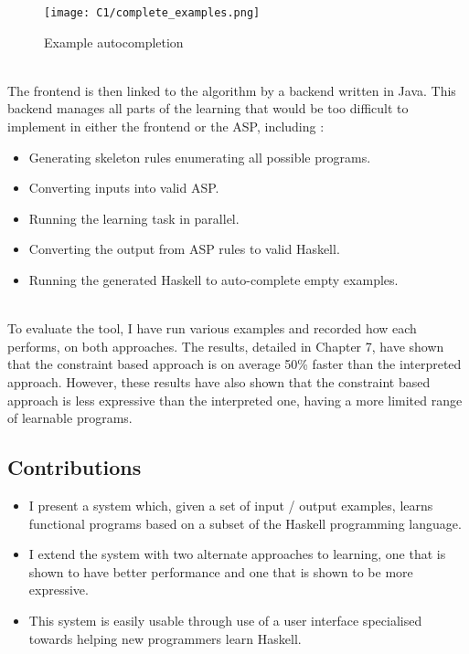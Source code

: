 \begin{figure}[h!]
\centering
\texttt{[image: C1/complete\_examples.png]}
\caption{Example autocompletion}
\label{fig:function_correctness}
\end{figure}
\mbox{}\\
The frontend is then linked to the algorithm by a backend written in Java. This backend manages all parts of the learning that would be too difficult to implement in either the frontend or the ASP, including :
\begin{itemize}
\item Generating skeleton rules enumerating all possible programs.
\item Converting inputs into valid ASP.
\item Running the learning task in parallel.
\item Converting the output from ASP rules to valid Haskell.
\item Running the generated Haskell to auto-complete empty examples.
\end{itemize}
\mbox{}\\
To evaluate the tool, I have run various examples and recorded how each performs, on both approaches. The results, detailed in Chapter 7, have shown that the constraint based approach is on average 50\% faster than the interpreted approach. However, these results have also shown that the constraint based approach is less expressive than the interpreted one, having a more limited range of learnable programs.

\subsection{Contributions}
\begin{itemize}
\item I present a system which, given a set of input / output examples, learns functional programs based on a subset of the Haskell programming language.
\item I extend the system with two alternate approaches to learning, one that is shown to have better performance and one that is shown to be more expressive.
\item This system is easily usable through use of a user interface specialised towards helping new programmers learn Haskell. 
\end{itemize}

\pagebreak
%
%